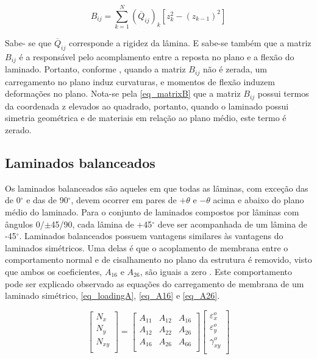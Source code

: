 \begin{equation} \label{eq_matrixB}
B_{ij}
=
\sum_{k=1}^N (\overline{Q}_{ij})_k [z_k^2 - (z_{k-1})^2]
\end{equation}

Sabe- se que $ \overline{Q}_{ij} $ corresponde a rigidez da lâmina. E sabe-se também que a matriz $ B_{ij} $ é a responsável pelo acomplamento entre a reposta no plano e a flexão do laminado. Portanto, conforme \cite{nasa1997guidelines}, quando a matriz $ B_{ij} $ não é zerada, um carregamento no plano induz curvaturas, e momentos de flexão induzem deformações no plano. Nota-se pela \autoref{eq_matrixB} que a matriz $ B_{ij} $ possui termos da coordenada z elevados ao quadrado, portanto, quando o laminado possui simetria geométrica e de materiais em relação ao plano médio, este termo é zerado.

\subsection{Laminados balanceados}
Os laminados balanceados são aqueles em que todas as lâminas, com exceção das de 0$^{\circ}$ e das de 90$^{\circ}$, devem ocorrer em pares de $ +\theta $ e $ -\theta $ acima e abaixo do plano médio do laminado. Para o conjunto de laminados compostos por lâminas com ângulos 0/$\pm$45/90, cada lâmina de +45$^{\circ}$ deve ser acompanhada de um lâmina de -45$^{\circ}$.
Laminados balanceados possuem vantagens similares às vantagens do laminados simétricos. Uma delas é que o acoplamento de membrana entre o comportamento normal e de cisalhamento no plano da estrutura é removido, visto que ambos os coeficientes, $ A_{16} $ e $ A_{26} $, são iguais a zero \cite{nasa1997guidelines}. Este comportamento pode ser explicado observado as equações do carregamento de membrana de um laminado simétrico, \autoref{eq_loadingA}, \autoref{eq_A16} e \autoref{eq_A26}.

\begin{equation} \label{eq_loadingA}
\begin{bmatrix}
    N_{x} \\
    N_{y} \\
    N_{xy} \\
\end{bmatrix}
=
\begin{bmatrix}
    A_{11} & A_{12} & A_{16}\\
    A_{12} & A_{22} & A_{26}\\
    A_{16} & A_{26} & A_{66}\\
\end{bmatrix}
\begin{bmatrix}
    \varepsilon_{x}^o \\
    \varepsilon_{y}^o \\
    \gamma_{xy}^o \\
\end{bmatrix}
\end{equation}

